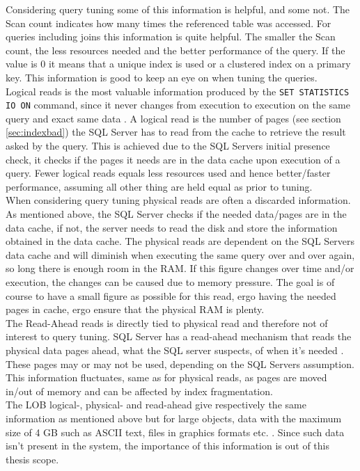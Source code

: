 \documentclass{cslthse-msc}
\begin{document}
Considering query tuning some of this information is helpful, and some not. The Scan count indicates how many times the referenced table was accessed. For queries including joins this information is quite helpful. The smaller the Scan count, the less resources needed and the better performance of the query. If the value is 0 it means that a unique index is used or a clustered index on a primary key. This information is good to keep an eye on when tuning the queries.\\ Logical reads is the most valuable information produced by the \texttt{SET STATISTICS IO ON} command, since it never changes from execution to execution on the same query and exact same data    \cite{IO}. A logical read is the number of pages (see section \ref{sec:indexbad}) the SQL Server has to read from the cache to retrieve the result asked by the query. This is achieved due to the SQL Servers initial presence check, it checks if the pages it needs are in the data cache upon execution of a query. Fewer logical reads equals less resources used and hence better/faster performance, assuming all other thing are held equal as prior to tuning.\\ When considering query tuning physical reads are often a discarded information. As mentioned above, the SQL Server checks if the needed data/pages are in the data cache, if not, the server needs to read the disk and store the information obtained in the data cache. The physical reads are dependent on the SQL Servers data cache and will diminish when executing the same query over and over again, so long there is enough room in the RAM. If this figure changes over time and/or execution, the changes can be caused due to memory pressure. The goal is of course to have a small figure as possible for this read, ergo having the needed pages in cache, ergo ensure that the physical RAM is plenty.\\ The Read-Ahead reads is directly tied to physical read and therefore not of interest to query tuning. SQL Server has a read-ahead mechanism that reads the physical data pages ahead, what the SQL server suspects, of when it's needed    \cite{readahead}. These pages may or may not be used, depending on the SQL Servers assumption. This information fluctuates, same as for physical reads, as pages are moved in/out of memory and can be affected by index fragmentation.\\ The LOB logical-, physical- and read-ahead give respectively the same information as mentioned above but for large objects, data with the maximum size of 4 GB such as ASCII text, files in graphics formats etc.    \cite{LOB}.  Since such data isn't present in the system, the importance of this information is out of this thesis scope.\\\\
\end{document}
